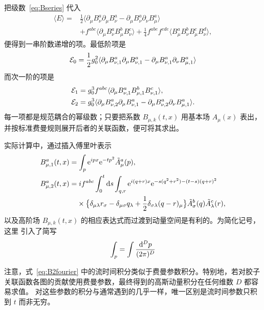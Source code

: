 把级数~\eqref{eq:Bseries} 代入
\begin{equation}
\begin{split}
  \langle E\rangle={}&
           \frac{1}{2}\langle\partial_{\mu}B^a_{\nu}\partial_{\mu}B^a_{\nu}-
           \partial_{\mu}B^a_{\nu}\partial_{\nu}B^a_{\mu}\rangle\\
  &+f^{abc}\langle\partial_{\mu}B^a_{\nu}B^b_{\mu}B^c_{\nu}\rangle
           +\frac{1}{4}f^{abe}f^{cde}\langle
           B^a_{\mu}B^b_{\nu}B^c_{\mu}B^d_{\nu}\rangle,
\end{split}
\label{eq:Eexpansion}
\end{equation}
便得到一串阶数递增的项。最低阶项是
\begin{equation}
  {\cal E}_0=\frac{1}{2}g_0^2
             \langle\partial_{\mu}B^a_{\nu,1}\partial_{\mu}B^a_{\nu,1}-
             \partial_{\mu}B^a_{\nu,1}\partial_{\nu}B^a_{\mu,1}\rangle
  \label{eq:E0def}
\end{equation}
而次一阶的项是
\begin{align}
  {\cal E}_1&=g_0^3
    f^{abc}\langle\partial_{\mu}B^a_{\nu,1}B^b_{\mu,1}B^c_{\nu,1}\rangle,
  \\
  {\cal E}_2&=
    g_0^3
    \langle\partial_{\mu}B^a_{\nu,2}\partial_{\mu}B^a_{\nu,1}-
           \partial_{\mu}B^a_{\nu,2}\partial_{\nu}B^a_{\mu,1}\rangle.
  \label{eq:E2def}
\end{align}
每一项都是规范耦合的幂级数；只要把系数 $B_{\mu,k}(t,x)$ 用基本场 $A_{\mu}(x)$ 表出，
并按标准费曼规则展开后者的关联函数，便可将其求出。

实际计算中，通过插入傅里叶表示
\begin{align}
  B^a_{\mu,1}(t,x)&=\int_p\rme^{ipx}\rme^{-tp^2}\tilde{A}^a_{\mu}(p),
  \label{eq:B1fourier}\\
  B^a_{\mu,2}(t,x)&=if^{abc}\int_0^t\rmd s\int_{q,r}
  \rme^{i(q+r)x}\rme^{-s(q^2+r^2)-(t-s)(q+r)^2}
  \nonumber\\
  &\hphantom{{}=}\times
  \bigl\{\delta_{\mu\lambda}r_{\sigma}-\delta_{\mu\sigma}q_{\lambda}
  +\frac{1}{2}\delta_{\sigma\lambda}(q-r)_{\mu}\bigr\}
  \tilde{A}_{\sigma}^b(q)\tilde{A}_{\lambda}^c(r),
  \label{eq:B2fourier}
\end{align}
以及高阶场 $B_{\mu,k}(t,x)$ 的相应表达式而过渡到动量空间是有利的。为简化记号，这里
引入了简写
\begin{equation}
  \int_{p}=\int{\mathrm{d}^D p\over(2\pi)^D}
  \label{eq:intp}
\end{equation}

注意，式~\eqref{eq:B2fourier} 中的流时间积分类似于费曼参数积分。特别地，若对胶子
关联函数各图的贡献使用费曼参数，最终得到的高斯动量积分在任何维数 $D$ 都容易求值。
对这些参数的积分与通常遇到的几乎一样，唯一区别是流时间参数只积到 $t$ 而非无穷。



